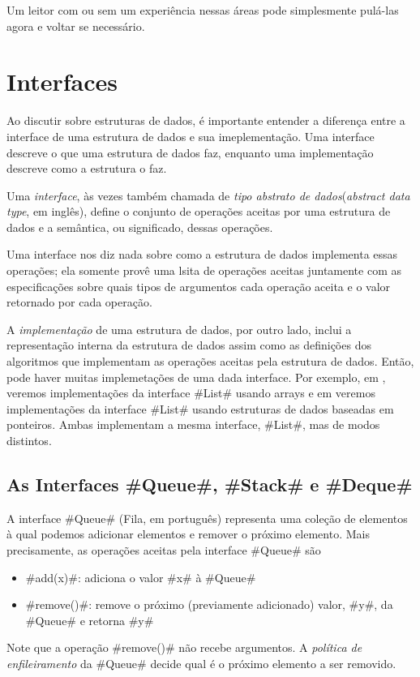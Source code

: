 Um leitor com ou sem um experiência nessas áreas pode simplesmente pulá-las agora e voltar se necessário.

\section{Interfaces}
Ao discutir sobre estruturas de dados, é importante entender a diferença entre a interface de uma estrutura de dados e sua imeplementação. 
Uma interface descreve o que uma estrutura de dados faz, enquanto uma implementação descreve como a estrutura o faz.

Uma \emph{interface},
%
%
às vezes também chamada de \emph{tipo abstrato de dados}(\emph{abstract data type}, em inglês),
define o conjunto de operações aceitas por uma estrutura de dados e a semântica, ou significado, dessas operações.

Uma interface nos diz nada sobre como a estrutura de dados implementa essas operações; ela somente provê uma lsita de operações aceitas juntamente com as especificações sobre quais tipos de argumentos cada operação aceita e o valor retornado por cada operação.

A \emph{implementação} de uma estrutura de dados, por outro lado, inclui a representação interna da estrutura de dados assim como as definições dos algoritmos que implementam as operações aceitas pela estrutura de dados. 
Então, pode haver muitas implemetações de uma dada interface.
Por exemplo, em , veremos implementações da interface #List# usando arrays e em  veremos implementações da interface #List# usando estruturas de dados baseadas em ponteiros. Ambas implementam a mesma interface, #List#, mas de modos distintos.

\subsection{As Interfaces #Queue#, #Stack# e #Deque#}

A interface #Queue# (Fila, em português) representa uma coleção de elementos à qual podemos
adicionar elementos e remover o próximo elemento. Mais precisamente, as operações
aceitas pela interface #Queue# são
\begin{itemize}
  \item #add(x)#: adiciona o valor #x# à #Queue#
  \item #remove()#: remove o próximo (previamente adicionado) valor, #y#, da #Queue# e retorna #y#
\end{itemize}
Note que 
a operação #remove()# não recebe argumentos.
A \emph{política de enfileiramento} da #Queue# decide qual é o próximo elemento a ser removido.

